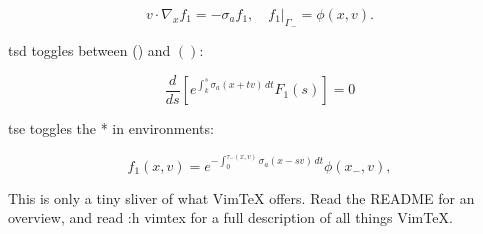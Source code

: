 \begin{equation}
  v \cdot \nabla_x f_1 = -\sigma_a f_1, \quad f_1 \rvert_{\Gamma_-} = \phi(x,v).
\end{equation}

tsd toggles between () and \( \left( \right) \):

\begin{equation*}
  \frac{d}{ds} \left[ e^{\int_k^s \sigma_a(x + tv)\,dt} F_1(s) \right] = 0
\end{equation*}

tse toggles the * in environments:

\begin{equation}
  f_1(x, v) = e^{-\int_0^{\tau_-(x, v)} \sigma_a(x - sv)\,dt} \phi(x_-, v),
\end{equation}

This is only a tiny sliver of what VimTeX offers.
Read the README for an overview, and read :h vimtex for a full description of
all things VimTeX.



